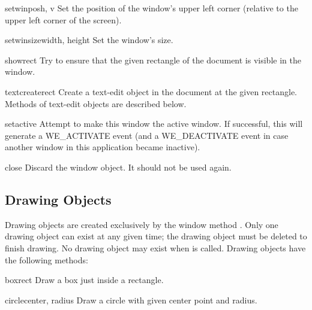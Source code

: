 \begin{methoddesc}[window]{setwinpos}{h, v}
Set the position of the window's upper left corner (relative to
the upper left corner of the screen).
\end{methoddesc}

\begin{methoddesc}[window]{setwinsize}{width, height}
Set the window's size.
\end{methoddesc}

\begin{methoddesc}[window]{show}{rect}
Try to ensure that the given rectangle of the document is visible in
the window.
\end{methoddesc}

\begin{methoddesc}[window]{textcreate}{rect}
Create a text-edit object in the document at the given rectangle.
Methods of text-edit objects are described below.
\end{methoddesc}

\begin{methoddesc}[window]{setactive}{}
Attempt to make this window the active window.  If successful, this
will generate a WE_ACTIVATE event (and a WE_DEACTIVATE event in case
another window in this application became inactive).
\end{methoddesc}

\begin{methoddesc}[window]{close}{}
Discard the window object.  It should not be used again.
\end{methoddesc}

\subsection{Drawing Objects}

Drawing objects are created exclusively by the window method
.  Only one drawing object can exist at any
given time; the drawing object must be deleted to finish drawing.  No
drawing object may exist when  is called.
Drawing objects have the following methods:

\begin{methoddesc}[drawing]{box}{rect}
Draw a box just inside a rectangle.
\end{methoddesc}

\begin{methoddesc}[drawing]{circle}{center, radius}
Draw a circle with given center point and radius.
\end{methoddesc}

